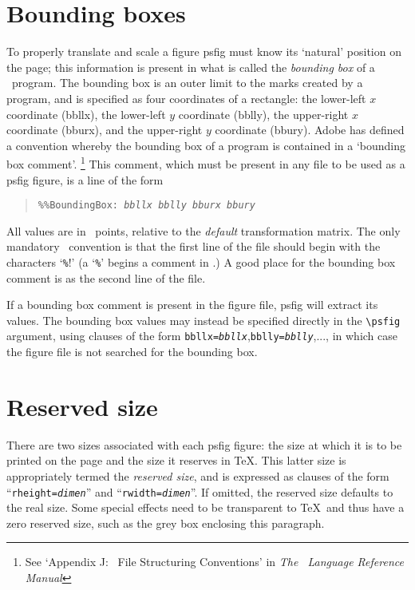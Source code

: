 \section{Bounding boxes}
To properly translate and scale a figure psfig must know its `natural'
position on the page; this information is present
in what is called the {\it bounding box} of a \Ps\ program. The 
bounding box is an outer limit to the marks created by a program,
and is specified as four coordinates of a rectangle: the lower-left $x$ coordinate
(bbllx), the lower-left $y$ coordinate (bblly), the upper-right
$x$ coordinate (bburx), and the upper-right $y$ coordinate (bbury).
Adobe has defined a convention whereby the bounding box of a program
is contained in a `bounding box comment'.
\footnote{See `Appendix J: \Ps\ File Structuring Conventions' in
{\it The \Ps\ Language Reference Manual}}
This comment, which must be present in any file to be used as a psfig figure,
is a line of the form
\begin{quote}
\tt \verb+%%+BoundingBox: \it bbllx bblly bburx bbury
\end{quote}
All values are in \Ps\ points, relative to the {\it default}
transformation matrix. The only mandatory \Ps\ convention is
that the first line of the file should begin with the characters
`\verb+%+!' (a `\verb+%+' begins a comment in \Ps.) A good place for the
bounding box comment is as the second line of the file.
\par
If a bounding box comment is present in the figure file, psfig will
extract its values.  The bounding box values may instead be specified
directly in the {\tt \verb+\+psfig} argument, using clauses of the
form {\tt bbllx=\it bbllx},{\tt bblly=\it bblly},..., in which case
the figure file is not searched for the bounding box.

\section{Reserved size}
\par
{}
\par
There are two sizes associated with each psfig figure: the size
at which it is to be printed on the page
and the size it reserves in \TeX. This latter size is appropriately
termed the {\it reserved size}, and is expressed as clauses of the form
``{\tt rheight={\it dimen}}''
and ``{\tt rwidth={\it dimen}}''. If omitted, the reserved size defaults
to the real size. Some special effects need to be transparent
to \TeX\ and thus have a zero reserved size, such as the grey
box enclosing
this paragraph.

